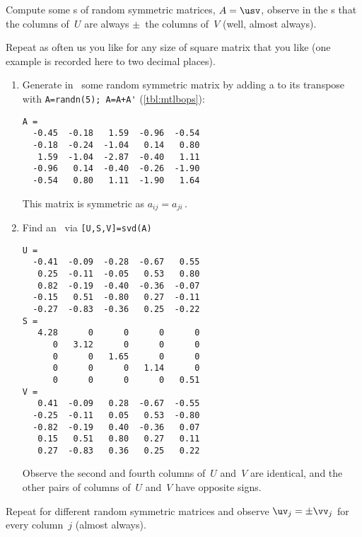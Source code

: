 \begin{example} \label{eg:symsigns}
Compute some \svd{}s of random symmetric matrices, \(A=\usv\), observe in the \svd{}s that the columns of~\(U\) are always \(\pm\)~the columns of~\(V\) (well, almost always).
\begin{solution} 
Repeat as often us you like for any size of square matrix that you like  (one example is recorded here to two decimal places).  
\begin{enumerate}
\item Generate in \script\ some random symmetric matrix by adding a 
 to its transpose with \verb|A=randn(5); A=A+A'| (\autoref{tbl:mtlbops}):
\setbox\ajrqrbox\hbox{}%
\marginajrbox%
\begin{verbatim}
A =
  -0.45  -0.18   1.59  -0.96  -0.54
  -0.18  -0.24  -1.04   0.14   0.80
   1.59  -1.04  -2.87  -0.40   1.11
  -0.96   0.14  -0.40  -0.26  -1.90
  -0.54   0.80   1.11  -1.90   1.64
\end{verbatim}
This matrix is symmetric as \(a_{ij}=a_{ji}\)\,.
\item Find an \svd\ via \verb|[U,S,V]=svd(A)|
\begin{verbatim}
U =
  -0.41  -0.09  -0.28  -0.67   0.55
   0.25  -0.11  -0.05   0.53   0.80
   0.82  -0.19  -0.40  -0.36  -0.07
  -0.15   0.51  -0.80   0.27  -0.11
  -0.27  -0.83  -0.36   0.25  -0.22
S =
   4.28      0      0      0      0
      0   3.12      0      0      0
      0      0   1.65      0      0
      0      0      0   1.14      0
      0      0      0      0   0.51
V =
   0.41  -0.09   0.28  -0.67  -0.55
  -0.25  -0.11   0.05   0.53  -0.80
  -0.82  -0.19   0.40  -0.36   0.07
   0.15   0.51   0.80   0.27   0.11
   0.27  -0.83   0.36   0.25   0.22
\end{verbatim}
Observe the second and fourth columns of~\(U\) and~\(V\) are identical, and the other pairs of columns of~\(U\) and~\(V\) have opposite signs.
\end{enumerate}
Repeat for different random symmetric matrices and observe \(\uv_j=\pm \vv_j\) for every column~\(j\) (almost always).
\end{solution}
\end{example}

